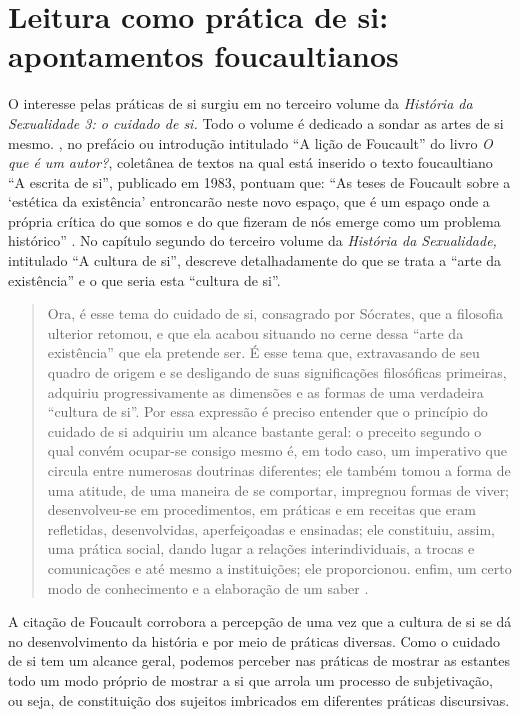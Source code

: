 \section{Leitura como prática de si: apontamentos foucaultianos}\label{sec-leituracomopraticadesiapontamentosfoucaultianos}

O interesse pelas práticas de si surgiu em \textcite{foucault2014historia} no terceiro volume
da \textit{História da Sexualidade 3: o cuidado de si.} Todo o volume é
dedicado a sondar as artes de si mesmo. \textcite{miranda2006licao}, no
prefácio ou introdução intitulado \enquote{A lição de Foucault} do livro
\textit{O que é um autor?}, coletânea de textos na qual está inserido o
texto foucaultiano \enquote{A escrita de si}, publicado em 1983, pontuam que:
\enquote{As teses de Foucault sobre a `estética da existência' entroncarão
neste novo espaço, que é um espaço onde a própria crítica do que somos e
do que fizeram de nós emerge como um problema histórico} \cite[p. 11]{miranda2006licao}. No capítulo segundo do terceiro volume da
\textit{História da Sexualidade,} intitulado \enquote{A cultura de si}, \textcite{foucault2014historia}
descreve detalhadamente do que se trata a \enquote{arte da existência} e o que
seria esta \enquote{cultura de si}.

\begin{quote}
Ora, é esse tema do cuidado de si, consagrado por Sócrates, que a
filosofia ulterior retomou, e que ela acabou situando no cerne dessa
\enquote{arte da existência} que ela pretende ser. É esse tema que,
extravasando de seu quadro de origem e se desligando de suas
significações filosóficas primeiras, adquiriu progressivamente as
dimensões e as formas de uma verdadeira \enquote{cultura de si}. Por essa
expressão é preciso entender que o princípio do cuidado de si adquiriu
um alcance bastante geral: o preceito segundo o qual convém ocupar-se
consigo mesmo é, em todo caso, um imperativo que circula entre numerosas
doutrinas diferentes; ele também tomou a forma de uma atitude, de uma
maneira de se comportar, impregnou formas de viver; desenvolveu-se em
procedimentos, em práticas e em receitas que eram refletidas,
desenvolvidas, aperfeiçoadas e ensinadas; ele constituiu, assim, uma
prática social, dando lugar a relações interindividuais, a trocas e
comunicações e até mesmo a instituições; ele proporcionou. enfim, um
certo modo de conhecimento e a elaboração de um saber \cite[p. 58]{foucault2014historia}.
\end{quote}

A citação de Foucault corrobora a percepção de \textcite{miranda2006licao} uma vez que a cultura de si se dá no desenvolvimento da história e por meio de
práticas diversas. Como o cuidado de si tem um alcance geral, podemos
perceber nas práticas de mostrar as estantes todo um modo próprio de
mostrar a si que arrola um processo de subjetivação, ou seja, de
constituição dos sujeitos imbricados em diferentes práticas discursivas.

